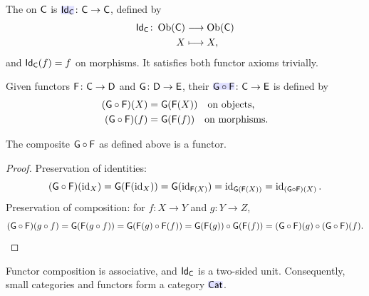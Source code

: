 \documentclass[../preamble]{subfiles}
\begin{document}
\begin{definition}
  \label{def:identity-functor}
  The  on $\mathsf{C}$ is
  $\newmath{\Functor{Id}_{\Category{C}}} \colon \Category{C} \lto \Category{C}$,
  defined by
  \begin{equation}
    \begin{aligned}
      \Functor{Id}_{\Category{C}} \colon \Ob(\Category{C}) &\lto \Ob(\Category{C}) \\
      X &\lmapsto X,
    \end{aligned}
    \label{eq:id-functor-ob}
  \end{equation}
  and $\mathsf{Id}_{\mathsf{C}}(f) = f$ on morphisms.
  It satisfies both functor axioms trivially.
\end{definition}

\begin{definition}
  \label{def:functor-composition}
  Given functors $\Functor{F} \colon \Category{C} \lto \Category{D}$
  and $\Functor{G} \colon \Category{D} \lto \Category{E}$,
  their 
  $\newmath{\Functor{G} \circ \Functor{F}} \colon \Category{C} \lto \Category{E}$
  is defined by
  \begin{align}
    \label{eq:functor-comp-ob}
    (\mathsf{G} \circ \mathsf{F})(X) &= \mathsf{G}(\mathsf{F}(X))
      \quad \text{on objects,} \\
    \label{eq:functor-comp-mor}
    (\mathsf{G} \circ \mathsf{F})(f) &= \mathsf{G}(\mathsf{F}(f))
      \quad \text{on morphisms.}
  \end{align}
\end{definition}

\begin{proposition}
  \label{prop:functor-comp-is-functor}
  The composite $\mathsf{G} \circ \mathsf{F}$ as defined above is a functor.
\end{proposition}

\begin{proof}
  Preservation of identities:
  \[
    (\mathsf{G} \circ \mathsf{F})(\operatorname{id}_X)
    = \mathsf{G}(\mathsf{F}(\operatorname{id}_X))
    = \mathsf{G}(\operatorname{id}_{\mathsf{F}(X)})
    = \operatorname{id}_{\mathsf{G}(\mathsf{F}(X))}
    = \operatorname{id}_{(\mathsf{G} \circ \mathsf{F})(X)}.
  \]
  Preservation of composition: for $f \colon X \to Y$ and $g \colon Y \to Z$,
  \[
    (\mathsf{G} \circ \mathsf{F})(g \circ f)
    = \mathsf{G}(\mathsf{F}(g \circ f))
    = \mathsf{G}(\mathsf{F}(g) \circ \mathsf{F}(f))
    = \mathsf{G}(\mathsf{F}(g)) \circ \mathsf{G}(\mathsf{F}(f))
    = (\mathsf{G} \circ \mathsf{F})(g) \circ (\mathsf{G} \circ \mathsf{F})(f). \qedhere
  \]
\end{proof}

\begin{remark}
  Functor composition is associative,
  and $\mathsf{Id}_{\mathsf{C}}$ is a two-sided unit.
  Consequently, small categories and functors form a category
  $\newmath{\Category{Cat}}$.
\end{remark}
\end{document}
